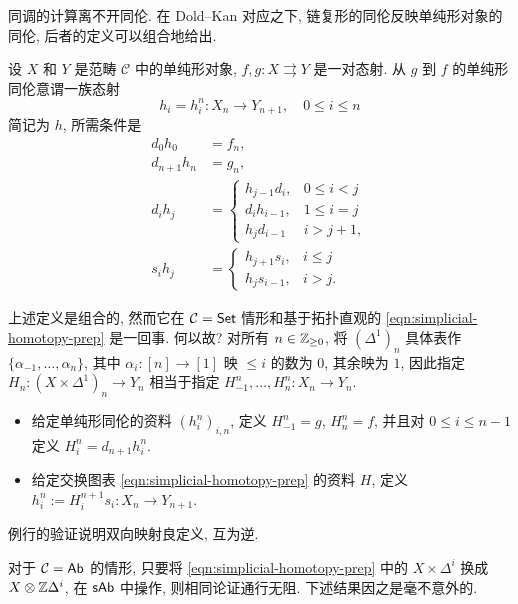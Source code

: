 同调的计算离不开同伦. 在 Dold--Kan 对应之下, 链复形的同伦反映单纯形对象的同伦, 后者的定义可以组合地给出.

\begin{definition}[单纯形同伦]\label{def:simplicial-homotopy}
	设 $X$ 和 $Y$ 是范畴 $\mathcal{C}$ 中的单纯形对象, $f, g: X \rightrightarrows Y$ 是一对态射. 从 $g$ 到 $f$ 的单纯形同伦意谓一族态射
	\[ h_i = h^n_i: X_n \to Y_{n+1}, \quad 0 \leq i \leq n \]
	简记为 $h$, 所需条件是
	\begin{align*}
		d_0 h_0 & = f_n, \\
		d_{n+1} h_n & = g_n, \\
		d_i h_j & = \begin{cases}
			h_{j-1} d_i, & 0 \leq i < j \\
			d_i h_{i-1}, & 1 \leq i = j \\
			h_j d_{i-1} & i > j+1,
		\end{cases} \\
		s_i h_j & = \begin{cases}
			h_{j+1} s_i, & i \leq j \\
			h_j s_{i-1}, & i > j.
		\end{cases}
	\end{align*}
\end{definition}

上述定义是组合的, 然而它在 $\mathcal{C} = \mathsf{Set}$ 情形和基于拓扑直观的 \eqref{eqn:simplicial-homotopy-prep} 是一回事. 何以故? 对所有 $n \in \mathbb{Z}_{\geq 0}$, 将 $(\Delta^1)_n$ 具体表作 $\{\alpha_{-1}, \ldots, \alpha_n\}$, 其中 $\alpha_i: [n] \to [1]$ 映 $\leq i$ 的数为 $0$, 其余映为 $1$, 因此指定 $H_n: (X \times \Delta^1)_n \to Y_n$ 相当于指定 $H^n_{-1}, \ldots, H^n_n: X_n \to Y_n$.
\begin{itemize}
	\item 给定单纯形同伦的资料 $(h^n_i)_{i, n}$, 定义 $H^n_{-1} = g$, $H^n_n = f$, 并且对 $0 \leq i \leq n-1$ 定义 $H^n_i = d_{n+1} h^n_i$.
	\item 给定交换图表 \eqref{eqn:simplicial-homotopy-prep} 的资料 $H$, 定义 $h^n_i := H^{n+1}_{i} s_i: X_n \to Y_{n+1}$.
\end{itemize}
例行的验证说明双向映射良定义, 互为逆.

对于 $\mathcal{C} = \mathsf{Ab}$ 的情形, 只要将 \eqref{eqn:simplicial-homotopy-prep} 中的 $X \times \Delta^i$ 换成 $X \otimes \mathbb{Z}\Delta^i$, 在 $\mathsf{sAb}$ 中操作, 则相同论证通行无阻. 下述结果因之是毫不意外的.


